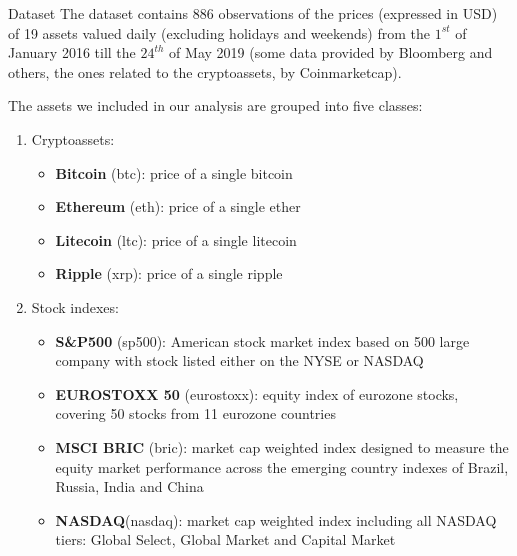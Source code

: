 \documentclass[aspectratio=169]{beamer}
\newcommand\Fontvi{\fontsize{8}{7.2}\selectfont}
\begin{document}
\begin{frame}[allowframebreaks]{Dataset}
\bigskip
\Fontvi
The dataset contains 886 observations of the prices (expressed in USD) of 19 assets valued daily (excluding holidays and weekends) from the $1^{st}$ of January 2016 till the $24^{th}$ of May 2019 (some data provided by Bloomberg and others, the ones related to the cryptoassets, by Coinmarketcap).


The assets we included in our analysis are grouped into five classes:

\begin{enumerate}
	\item Cryptoassets:
	\begin{itemize}
		\Fontvi
		\item \textbf{Bitcoin} (btc): price of a single bitcoin
		\item \textbf{Ethereum} (eth): price of a single ether
		\item \textbf{Litecoin} (ltc): price of a single litecoin
		\item \textbf{Ripple} (xrp): price of a single ripple
	\end{itemize}

	\item Stock indexes:
	\begin{itemize}
		\Fontvi
		\item \textbf{S\&P500} (sp500): American stock market index based on 500 large company with stock listed either on the NYSE or NASDAQ
		\item \textbf{EUROSTOXX 50} (eurostoxx): equity index of eurozone stocks, covering 50 stocks from 11 eurozone countries
		\item \textbf{MSCI BRIC} (bric): market cap weighted index designed to measure the equity market performance across the emerging country indexes of Brazil, Russia, India and China
		\item \textbf{NASDAQ}(nasdaq): market cap weighted index including all NASDAQ tiers: Global Select, Global Market and Capital Market
	\end{itemize}
	
	\framebreak
	

\end{enumerate}
\end{frame}
\end{document}
